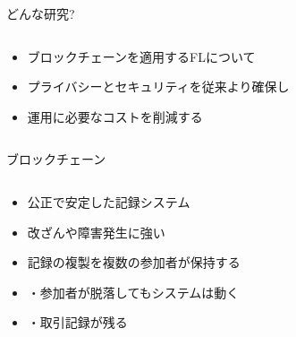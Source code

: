 \documentclass[unicode,12pt,aspectratio=169, dvipdfmx]{beamer}
\begin{document}
    \begin{frame}{どんな研究?}
        \begin{columns}
            \begin{column}{.8\linewidth}
                \begin{itemize}
                    \item ブロックチェーンを適用するFLについて
                    \item プライバシーとセキュリティを従来より確保し
                    \item 運用に必要なコストを削減する
                \end{itemize}          
            \end{column}
        \end{columns}
    \end{frame}


    \begin{frame}{ブロックチェーン}
        \begin{columns}
            \begin{column}[T]{.7\linewidth}
                \begin{itemize}
                    \item 公正で安定した記録システム
                    \item 改ざんや障害発生に強い
                    \item 記録の複製を複数の参加者が保持する
                    \item ・参加者が脱落してもシステムは動く
                    \item ・取引記録が残る
                \end{itemize}
            \end{column}
        \end{columns}
    \end{frame}
\end{document}
